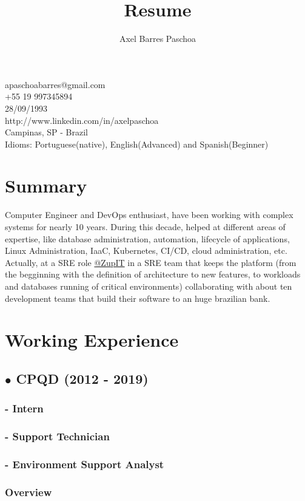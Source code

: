 \documentclass{article}
\makeatletter
\renewcommand{\maketitle}{

\begin{center}

{\huge\bfseries\theauthor}

apaschoabarres@gmail.com \\
+55 19 997345894 \\
28/09/1993 \\
http://www.linkedin.com/in/axelpaschoa \\
Campinas, SP - Brazil \\
Idioms: Portuguese(native), English(Advanced) and Spanish(Beginner)
\end{center}
}
\makeatother
\begin{document}
\title{Resume}
\author{Axel Barres Paschoa}

\maketitle

\section{Summary}

Computer Engineer and DevOps enthusiast, have been working with complex systems for nearly 10 years. During this decade, helped at different areas of expertise, like database administration, automation, lifecycle of applications, Linux Administration, IaaC, Kubernetes, CI/CD, cloud administration, etc. Actually, at a SRE role \href{https://github.com/ZupIT}{@ZupIT} in a SRE team that keeps the platform (from the begginning with the definition of architecture to new features, to workloads and databases running of critical environments) collaborating with about ten development teams that build their software to an huge brazilian bank.


\section{Working Experience}

\subsection{$\bullet$ CPQD (2012 - 2019)}

\subsubsection{- Intern}

\subsubsection{- Support Technician}

\subsubsection{- Environment Support Analyst \\}

\subsubsection{Overview \\}
\end{document}
